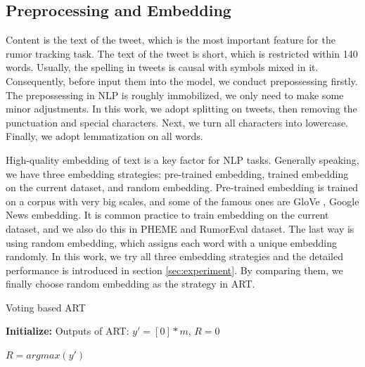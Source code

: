 \subsection{Preprocessing and Embedding}
\label{sec:process_embedding}
Content is the text of the tweet, which is the most important feature for the rumor tracking task. The text of the tweet is short, which is restricted within 140 words. Usually, the spelling in tweets is causal with symbols mixed in it. Consequently, before input them into the model, we conduct prepossessing firstly. The prepossessing in NLP is roughly immobilized, we only need to make some minor adjustments. In this work, we adopt splitting on tweets, then removing the punctuation and special characters. Next, we turn all characters into lowercase. Finally, we adopt lemmatization on all words.

High-quality embedding of text is a key factor for NLP tasks. Generally speaking, we have three embedding strategies: pre-trained embedding, trained embedding on the current dataset, and random embedding. Pre-trained embedding is trained on a corpus with very big scales, and some of the famous ones are GloVe \cite{DBLP:conf/emnlp/PenningtonSM14}, Google News embedding\cite{googlenews}. It is common practice to train embedding on the current dataset, and we also do this in PHEME and RumorEval dataset. The last way is using random embedding, which assigns each word with a unique embedding randomly. In this work, we try all three embedding strategies and the detailed performance is introduced in section \ref{sec:experiment}. By comparing them, we finally choose random embedding as the strategy in ART.

\begin{algorithm}[tbp]
	\caption{Voting based ART}
	\label{algorithm:art}
	\LinesNumbered %
	\textbf{Initialize:} Outputs of ART: $y' = [0]*m$, $R = 0$ \;
	
	
	$R = argmax(y')$
\end{algorithm}


